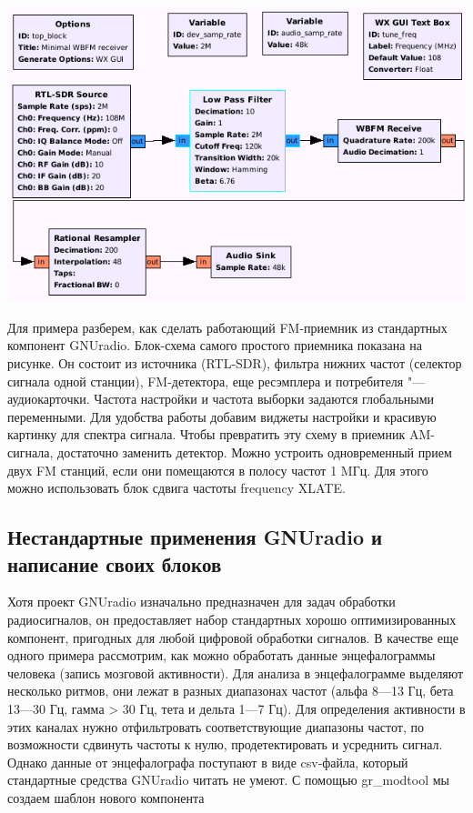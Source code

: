 \documentclass[10pt, a5paper]{article}
\begin{document}
\begin{center}
  \includegraphics[width=\textwidth]{112_2014_w_Adamov_struct.png}
\end{center}

Для примера разберем, как сделать работающий FM-приемник из стандартных компонент GNUradio. Блок-схема самого простого приемника показана на рисунке.  Он состоит из источника (RTL-SDR), фильтра нижних частот (селектор сигнала одной станции), FM-детектора, еще ресэмплера и потребителя "--- аудиокарточки. Частота настройки и частота выборки задаются глобальными переменными. Для удобства работы добавим виджеты настройки и красивую картинку для спектра сигнала. Чтобы превратить эту схему в приемник AM-сигнала, достаточно заменить детектор. Можно устроить одновременный прием двух FM станций, если они помещаются в полосу частот 1 MГц. Для этого можно использовать блок сдвига частоты frequency XLATE.



\subsection*{Нестандартные применения GNUradio и написание своих блоков}

Хотя проект GNUradio изначально предназначен для задач обработки радиосигналов, он предоставляет набор стандартных хорошо оптимизированных компонент, пригодных для любой цифровой обработки сигналов. В качестве еще одного примера рассмотрим, как можно обработать данные энцефалограммы человека (запись мозговой активности). Для анализа в энцефалограмме выделяют несколько ритмов, они лежат в разных диапазонах частот (альфа 8---13 Гц, бета 13---30 Гц, гамма \textgreater{} 30 Гц, тета и дельта 1---7 Гц). Для определения активности в этих каналах нужно отфильтровать соответствующие диапазоны частот, по возможности сдвинуть частоты к нулю, продетектировать и усреднить сигнал. Однако данные от энцефалографа поступают в виде csv-файла, который стандартные средства GNUradio читать не умеют. С помощью gr\_modtool мы создаем шаблон нового компонента
\end{document}
